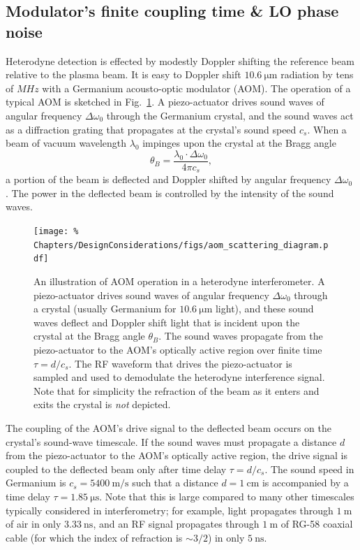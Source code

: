 \subsection{Modulator's finite coupling time \& LO phase noise}
\label{sec:DesignConsiderations:phase_noise:LO}
Heterodyne detection is effected by
modestly Doppler shifting the reference beam
relative to the plasma beam.
It is easy to Doppler shift $\SI{10.6}{\micro\meter}$ radiation
by tens of $MHz$ with a Germanium acousto-optic modulator (AOM).
The operation of a typical AOM is sketched in
Fig.~\ref{fig:DesignConsiderations:aom_scattering_diagram}.
A piezo-actuator drives sound waves
of angular frequency $\Delta \omega_0$
through the Germanium crystal, and
the sound waves act as a diffraction grating
that propagates at the crystal's sound speed $c_s$.
When a beam of vacuum wavelength $\lambda_0$
impinges upon the crystal at the Bragg angle
\begin{equation}
  \theta_B = \frac{\lambda_0 \cdot \Delta \omega_0}{4 \pi c_s},
  \label{eq:DesignConsiderations:Bragg_angle}
\end{equation}
a portion of the beam is deflected and
Doppler shifted by angular frequency $\Delta \omega_0$
\cite[Sec.~20.1]{saleh_and_teich}.
The power in the deflected beam
is controlled by the intensity of the sound waves.

\begin{figure}
  \centering
  \texttt{[image: \%
    Chapters/DesignConsiderations/figs/aom\_scattering\_diagram.pdf]}
  \caption[Illustration of AOM operation in a heterodyne interferometer]{%
    An illustration of AOM operation in a heterodyne interferometer.
    A piezo-actuator drives sound waves of angular frequency $\Delta \omega_0$
    through a crystal (usually Germanium for $\SI{10.6}{\micro\meter}$ light),
    and these sound waves deflect and Doppler shift light
    that is incident upon the crystal at the Bragg angle $\theta_B$.
    The sound waves propagate from the piezo-actuator
    to the AOM's optically active region
    over finite time $\tau = d / c_s$.
    The RF waveform that drives the piezo-actuator
    is sampled and used to demodulate the heterodyne interference signal.
    Note that for simplicity the refraction of the beam
    as it enters and exits the crystal is \emph{not} depicted.}
\label{fig:DesignConsiderations:aom_scattering_diagram}
\end{figure}

The coupling of the AOM's drive signal to the deflected beam
occurs on the crystal's sound-wave timescale.
If the sound waves must propagate a distance $d$
from the piezo-actuator to the AOM's optically active region,
the drive signal is coupled to the deflected beam
only after time delay $\tau = d / c_s$.
The sound speed in Germanium is $c_s = \SI{5400}{\meter\per\second}$
such that a distance $d = \SI{1}{\centi\meter}$
is accompanied by a time delay $\tau = \SI{1.85}{\micro\second}$.
Note that this is large compared to many other timescales
typically considered in interferometry;
for example, light propagates
through $\SI{1}{\meter}$ of air
in only $\SI{3.33}{\nano\second}$,
and an RF signal propagates
through $\SI{1}{\meter}$ of RG-58 coaxial cable
(for which the index of refraction is $\sim 3 / 2$)
in only $\SI{5}{\nano\second}$.

